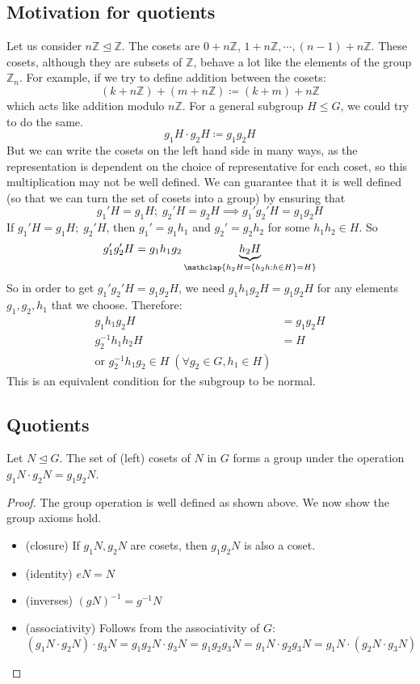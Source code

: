 \subsection{Motivation for quotients}
Let us consider \(n\mathbb Z \trianglelefteq \mathbb Z\).
The cosets are \(0+n\mathbb Z\), \(1 + n\mathbb Z, \cdots, (n-1) + n\mathbb Z\).
These cosets, although they are subsets of \(\mathbb Z\), behave a lot like the elements of the group \(\mathbb Z_n\).
For example, if we try to define addition between the cosets:
\[
	(k + n \mathbb Z) + (m + n \mathbb Z) \coloneq (k+m) + n \mathbb Z
\]
which acts like addition modulo \(n\mathbb Z\).
For a general subgroup \(H \leq G\), we could try to do the same.
\[
	g_1 H \cdot g_2 H \coloneq g_1 g_2 H
\]
But we can write the cosets on the left hand side in many ways, as the representation is dependent on the choice of representative for each coset, so this multiplication may not be well defined.
We can guarantee that it is well defined (so that we can turn the set of cosets into a group) by ensuring that
\[
	g_1' H = g_1 H;\; g_2' H = g_2 H \implies g_1'g_2'H = g_1g_2H
\]
If \(g_1' H = g_1 H;\; g_2' H\), then \(g_1' = g_1h_1\) and \(g_2' = g_2h_2\) for some \(h_1 h_2 \in H\).
So
\[
	g_1'g_2'H = g_1h_1g_2\underbrace{h_2H}_{\mathclap{h_2H = \{ h_2h : h \in H \} = H}}
\]
So in order to get \(g_1' g_2' H = g_1 g_2 H\), we need \(g_1 h_1 g_2 H = g_1 g_2 H\) for any elements \(g_1, g_2, h_1\) that we choose.
Therefore:
\begin{align*}
	g_1h_1g_2H         & = g_1g_2 H \\
	g_2^{-1} h_1 h_2 H & = H        \\
	\text{or } g_2^{-1} h_1 g_2 \in H\;(\forall g_2 \in G, h_1 \in H)
\end{align*}
This is an equivalent condition for the subgroup to be normal.

\subsection{Quotients}
\begin{proposition}
	Let \(N \trianglelefteq G\).
	The set of (left) cosets of \(N\) in \(G\) forms a group under the operation \(g_1N\cdot g_2N = g_1g_2N\).
\end{proposition}
\begin{proof}
	The group operation is well defined as shown above.
	We now show the group axioms hold.
	\begin{itemize}
		\item (closure) If \(g_1N, g_2N\) are cosets, then \(g_1g_2N\) is also a coset.
		\item (identity) \(eN = N\)
		\item (inverses) \((gN)^{-1} = g^{-1}N\)
		\item (associativity) Follows from the associativity of \(G\): \((g_1 N \cdot g_2 N)\cdot g_3 N = g_1g_2 N \cdot g_3 N = g_1g_2g_3 N = g_1 N \cdot g_2g_3 N = g_1 N \cdot (g_2 N \cdot g_3 N)\)
	\end{itemize}
\end{proof}

